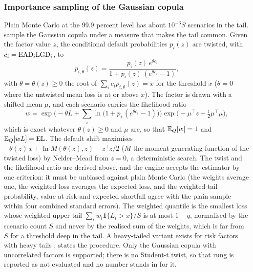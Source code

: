 \subsubsection{Importance sampling of the Gaussian copula}

Plain Monte Carlo at the 99.9 percent level has about $10^{-3}S$ scenarios in the tail. \citet{credit-capital:glassermanli2005} sample the
Gaussian copula under a measure that makes the tail common. Given the factor value $z$, the conditional default probabilities
$p_i(z)$ are twisted, with $c_i=\mathrm{EAD}_i\mathrm{LGD}_i$, to
\begin{equation}
p_{i,\theta}(z)=\frac{p_i(z)\,e^{\theta c_i}}{1+p_i(z)\,(e^{\theta c_i}-1)},
\label{eq:cc-twist}
\end{equation}
with $\theta=\theta(z)\ge0$ the root of $\sum_ic_ip_{i,\theta}(z)=x$ for the threshold $x$ ($\theta=0$ where the untwisted mean loss is at or
above $x$). The factor is drawn with a shifted mean $\mu$, and each scenario carries the likelihood ratio
\begin{equation}
w=\exp\Big(-\theta L+\sum_i\ln\big(1+p_i\,(e^{\theta c_i}-1)\big)\Big)\exp\Big(-\mu^{\top}z+\tfrac12\mu^{\top}\mu\Big),
\label{eq:cc-weight}
\end{equation}
which is exact whatever $\theta(z)\ge0$ and $\mu$ are, so that $\mathbb{E}_Q[w]=1$ and $\mathbb{E}_Q[wL]=\mathrm{EL}$. The default shift maximises
$-\theta(z)\,x+\ln M(\theta(z),z)-z^{\top}z/2$ ($M$ the moment generating function of the twisted loss) by Nelder--Mead from $z=0$, a
deterministic search. The twist and the likelihood ratio are derived above, and the engine accepts the estimator by one criterion: it must be unbiased against plain Monte Carlo (the weights average one, the weighted
loss averages the expected loss, and the weighted tail probability, value at risk and expected shortfall agree with the plain sample within
four combined standard errors). The weighted quantile is the smallest loss whose weighted upper tail $\sum_iw_i\mathbf 1\{L_i>x\}/S$ is at
most $1-q$, normalised by the scenario count $S$ and never by the realised sum of the weights, which is far from $S$ for a threshold deep in
the tail. A heavy-tailed variant exists for risk factors with heavy tails \citep{credit-capital:ghs2002}.  states the procedure. Only the Gaussian copula with uncorrelated factors is supported; there is no Student-t
twist, so that rung is reported as not evaluated and no number stands in for it.

